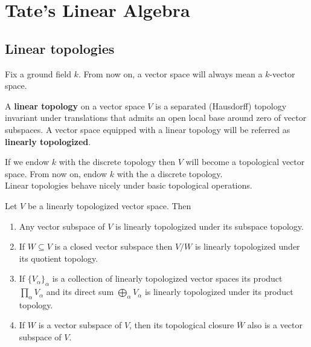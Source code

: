 \chapter{Tate's Linear Algebra}\label{ch:tate-linear-algebra}
\section{Linear topologies}
Fix a ground field $k$. From now on, a vector space will always mean a $k$-vector space.
\begin{definition}\label{linear_topology}
A \textbf{linear topology} on a vector space $V$ is a separated (Hausdorff) topology invariant under translations that admits an open local base around zero of vector subspaces. A vector space equipped with a linear topology will be referred as \textbf{linearly topologized}.
\end{definition}
If we endow $k$ with the discrete topology then $V$ will become a topological vector space. From now on, endow $k$ with the a discrete topology. \\
Linear topologies behave nicely under basic topological operations.
\begin{proposition}\label{linear_topologies_properties}
Let $V$ be a linearly topologized vector space. Then
	\begin{enumerate}[label = (\alph*)]
		\item Any vector subspace of $V$ is linearly topologized under its subspace topology.
		\item If $W \subseteq V$ is a closed vector subspace then $V/W$ is linearly topologized under its quotient topology.
		\item If $\{V_{\alpha}\}_{\alpha}$ is a collection of linearly topologized vector spaces its product $\prod_{\alpha} V_{\alpha}$ and its direct sum $\bigoplus_{\alpha} V_{\alpha}$ is linearly topologized under its product topology.
		\item If $W$ is a vector subspace of $V$, then its topological closure $\overline{W}$ also is a vector subspace of $V$.
	\end{enumerate}
\end{proposition}
